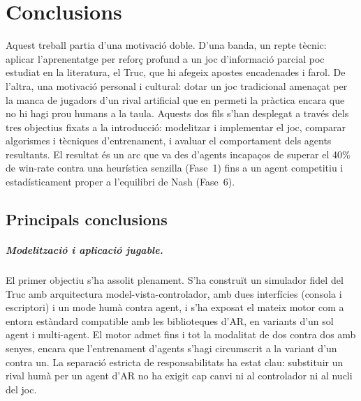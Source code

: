 
\chapter{Conclusions}
\label{cap:conclusions}

Aquest treball partia d'una motivació doble. D'una banda, un repte tècnic: aplicar
l'aprenentatge per reforç profund a un joc d'informació parcial poc estudiat en la literatura, el Truc, que
hi afegeix apostes encadenades i farol. De l'altra, una motivació personal i cultural:
dotar un joc tradicional amenaçat per la manca de jugadors d'un rival artificial que en
permeti la pràctica encara que no hi hagi prou humans a la taula. Aquests dos fils s'han
desplegat a través dels tres objectius fixats a la introducció: modelitzar i implementar el
joc, comparar algorismes i tècniques d'entrenament, i avaluar el comportament dels agents
resultants. El resultat és un arc que va des d'agents incapaços
de superar el 40\% de win-rate contra una heurística senzilla (Fase~1) fins a un agent
competitiu i estadísticament proper a l'equilibri de Nash (Fase~6).

\section{Principals conclusions}

\paragraph{Modelització i aplicació jugable.} El primer objectiu s'ha assolit plenament.
S'ha construït un simulador fidel del Truc amb arquitectura model-vista-controlador, amb dues interfícies
(consola i escriptori) i un mode humà contra agent, i s'ha exposat el mateix motor com a
entorn estàndard compatible amb les biblioteques d'\ac{AR}, en variants d'un sol agent i
multi-agent. El motor admet fins i tot la modalitat de dos contra dos amb senyes, encara
que l'entrenament d'agents s'hagi circumscrit a la variant d'un contra un. La separació
estricta de responsabilitats ha estat clau: substituir un rival humà per un agent d'\ac{AR}
no ha exigit cap canvi ni al controlador ni al nucli del joc.

